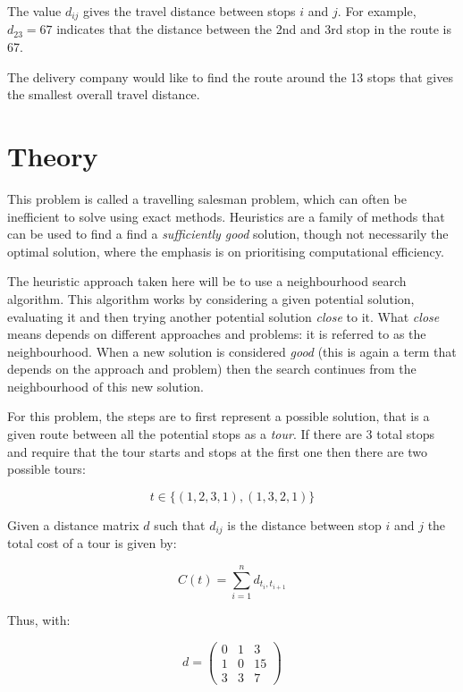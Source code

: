 The value \(d_{ij}\) gives the travel distance between
stops \(i\) and \(j\). For example, \(d_{23}=67\) %
indicates that the distance between the 2nd and 3rd stop in the route is 67. %


The delivery company would like to find the route around the 13 stops that gives
the smallest overall travel distance.


\section{Theory}\label{sec:theory}

This problem is called a travelling salesman problem, which can 
often be inefficient to solve using exact methods.
Heuristics are a family of methods that can be used to find a find a
\emph{sufficiently good} solution, though not necessarily the optimal solution,
where the emphasis is on prioritising computational efficiency.

The heuristic approach taken here will be to use a neighbourhood search algorithm.
This algorithm works by considering a given potential solution, evaluating it
and then trying another potential solution \emph{close} to it. What \emph{close}
means depends on different approaches and problems: it is referred to as the
neighbourhood. When a new solution is considered \emph{good} (this is
again a term that depends on the approach and problem) then the search
continues from the neighbourhood of this new solution.

For this problem, the steps are to first represent a possible solution, that is a given route
between all the potential stops as a \emph{tour}. If there are 3 total stops
and require that the tour starts and stops at the first one then there are two
possible tours:

\[
    t \in \{(1, 2, 3, 1), (1, 3, 2, 1)\}
\]

Given a distance matrix \(d\) such that \(d_{ij}\) is the distance between stop
\(i\) and \(j\) the total cost of a tour is given by:

\[
    C(t)=\sum_{i=1}^{n} d_{t_i, t_{i + 1}}
\]

Thus, with:

\[
    d = \begin{pmatrix}
        0 & 1 & 3\\
        1 & 0 & 15\\
        3 & 3 & 7
        \end{pmatrix}
\]

